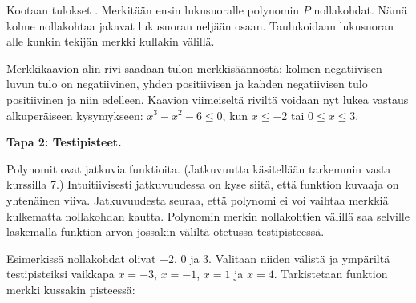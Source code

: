 Kootaan tulokset . Merkitään ensin
lukusuoralle polynomin $P$ nollakohdat. Nämä kolme nollakohtaa jakavat
lukusuoran neljään osaan. Taulukoidaan lukusuoran alle kunkin tekijän
merkki kullakin välillä.
\begin{center}
    \begin{merkkikaavio}{3}

        \merkkikaavioMerkki{$-$}
        \merkkikaavioMerkki{$+$}
        \merkkikaavioMerkki{$+$}
        \merkkikaavioMerkki{$+$}

        \merkkikaavioUusirivi
        \merkkikaavioMerkki{$-$}
        \merkkikaavioMerkki{$-$}
        \merkkikaavioMerkki{$-$}
        \merkkikaavioMerkki{$+$}

        \merkkikaavioUusirivi
        \merkkikaavioMerkki{$-$}
        \merkkikaavioMerkki{$-$}
        \merkkikaavioMerkki{$+$}
        \merkkikaavioMerkki{$+$}

        \merkkikaavioUusiriviKaksoisviiva
        \merkkikaavioMerkki{$-$}
        \merkkikaavioMerkki{$+$}
        \merkkikaavioMerkki{$-$}
        \merkkikaavioMerkki{$+$}
    \end{merkkikaavio}
\end{center}
Merkkikaavion alin rivi saadaan tulon merkkisäännöstä: kolmen negatiivisen luvun tulo on negatiivinen, yhden positiivisen ja kahden negatiivisen tulo positiivinen ja
niin edelleen.
Kaavion viimeiseltä riviltä voidaan nyt lukea vastaus alkuperäiseen kysymykseen: $x^3-x^2-6 \leq 0$, kun $x\leq -2$ tai $0\leq x \leq 3$.

\textbf{Tapa 2: Testipisteet.}

Polynomit ovat jatkuvia funktioita. (Jatkuvuutta käsitellään tarkemmin vasta kurssilla 7.)
Intuitiivisesti jatkuvuudessa on kyse siitä, että funktion kuvaaja on yhtenäinen viiva.
Jatkuvuudesta seuraa, että polynomi ei voi vaihtaa merkkiä kulkematta nollakohdan kautta.
Polynomin merkin nollakohtien välillä saa selville laskemalla funktion
arvon jossakin väliltä otetussa testipisteessä.

Esimerkissä nollakohdat olivat $-2$, $0$ ja $3$. Valitaan niiden välistä ja
ympäriltä testipisteiksi vaikkapa $x=-3$, $x=-1$, $x=1$ ja $x=4$. Tarkistetaan funktion merkki kussakin pisteessä:

